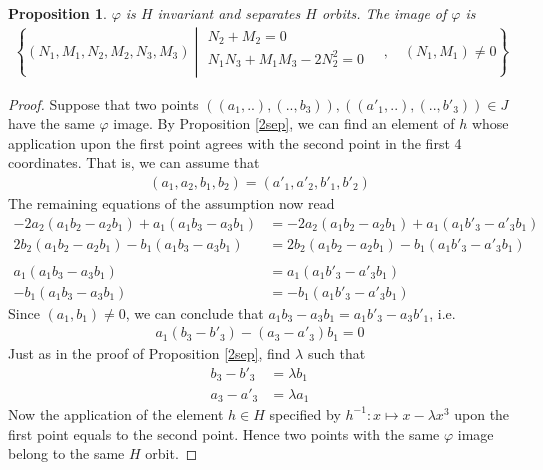 \documentclass[12pt]{article}
\numberwithin{equation}{section}
\theoremstyle{plain}
\newtheorem{proposition}[definition]{Proposition}
\theoremstyle{definition}
\begin{document}
\begin{proposition}\label{3sep} $\varphi$ is $H$ invariant and separates $H$ orbits. The image of $\varphi$ is
\begin{align*}
\left\{ (N_1,M_1,N_2,M_2,N_3,M_3)  \mathrel{}\middle|\mathrel{}
\begin{matrix}
 N_2+M_2=0\\
 N_1N_3+M_1M_3-2N_2^2=0\\
\end{matrix}\quad, \quad(N_1,M_1)\neq 0
\right\}
\end{align*}
\end{proposition}
\begin{proof} Suppose that two points $((a_1,..),(..,b_3)),((a'_1,..),(..,b'_3))\in J$ have the same $\varphi$ image. By Proposition \ref{2sep}, we can find an element of $h$ whose application upon the first point agrees with the second point in the first 4 coordinates. That is, we can assume that
\begin{align*}
(a_1,a_2,b_1,b_2) = (a'_1,a'_2,b'_1,b'_2)
\end{align*}
The remaining equations of the assumption now read
\begin{align*}
-2a_2(a_{1}b_{2}-a_2b_{1}) +  a_{1}(a_{1}b_{3}-a_{3}b_{1}) &= -2a_2(a_{1}b_{2}-a_2b_{1}) +  a_{1}(a_{1}b'_{3}-a'_{3}b_{1})\\
 2b_2(a_{1}b_{2}-a_2b_{1}) -  b_{1}(a_{1}b_{3}-a_{3}b_{1}) &=  2b_2(a_{1}b_{2}-a_2b_{1}) -  b_{1}(a_{1}b'_{3}-a'_{3}b_{1})\\
 \quad\\
 a_{1}(a_{1}b_{3}-a_{3}b_{1}) &=  a_{1}(a_{1}b'_{3}-a'_{3}b_{1})\\
 -b_{1}(a_{1}b_{3}-a_{3}b_{1}) &= -b_{1}(a_{1}b'_{3}-a'_{3}b_{1})
\end{align*}
Since $(a_1,b_1)\neq 0$, we can conclude that $a_{1}b_{3}-a_{3}b_{1}=a_{1}b'_{3}-a_{3}b'_{1}$, i.e.
\begin{align*}
a_{1}(b_{3}-b'_{3})-(a_{3}-a'_{3})b_{1}=0
\end{align*}
Just as in the proof of Proposition \ref{2sep}, find $\lambda$ such that 
\begin{align*}
b_3-b'_3&=\lambda b_1\\
a_3-a'_3&=\lambda a_1
\end{align*}
Now the application of the element $h\in H$ specified by $h^{-1}:x\mapsto x-\lambda x^{3}$ upon the first point equals to the second point. Hence two points with the same $\varphi$ image belong to the same $H$ orbit.


\end{proof}
\end{document}
